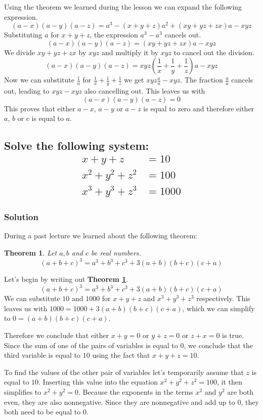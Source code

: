 \documentclass{article}
\newcommand{\solution}{\subsubsection*{\textcolor{MainColor}{Solution}}}
\newcounter{theoremcounter}
\theoremstyle{maintheorem}
\newtheorem{theorem}[theoremcounter]{\textcolor{SubColor}{Theorem}}
\newcommand{\thmref}[1]{\textcolor{SubSubColor}{\textbf{Theorem \ref{#1}}}}
\begin{document}
Using the theorem we learned during the lesson we can expand the following expression.
\[(a-x)(a-y)(a-z) = a^3 - (x + y + z)a^2 + (xy + yz + zx)a - xyz\]
Substituting $a$ for $ x + y + z $, the expression $a^3 - a^3$ cancels out.
\[(a-x)(a-y)(a-z) = (xy + yz + zx)a - xyz\]
We divide $xy + yz + zx$ by $xyz$ and multiply it by $xyz$ to cancel out the division.
\[(a-x)(a-y)(a-z) = xyz\left(\frac{1}{x} + \frac{1}{y} + \frac{1}{z}\right)a - xyz\]
Now we can substitute $ \frac{1}{a} $ for $ \frac{1}{x} + \frac{1}{y} + \frac{1}{z} $ we get $ xyz\frac{a}{a} - xyz $. The fraction $ \frac{a}{a} $ cancels out, leading to $xyz - xyz$ also cancelling out.
This leaves us with
\[(a-x)(a-y)(a-z) = 0\]
This proves that either $a - x$, $a - y$ or $a - z$ is equal to zero and therefore either $a$, $b$ or $c$ is equal to $a$.

\subsection{
	\normalfont
	Solve the following system:
	\begin{align*}
		x + y + z       & = 10   \\
		x^2 + y^2 + z^2 & = 100  \\
		x^3 + y^3 + z^3 & = 1000
	\end{align*}
}

\solution

During a past lecture we learned about the following theorem:
\begin{theorem}\label{thm2}
	Let $a, b$ and $c$ be real numbers.
	\[ (a + b + c)^3 = a^3 + b^3 + c^3 + 3(a + b)(b + c)(c + a) \]
\end{theorem}

Let's begin by writing out \thmref{thm2}.
\[ (a + b + c)^3 = a^3 + b^3 + c^3 + 3(a + b)(b + c)(c + a) \]
We can substitute $10$ and $1000$ for $x + y + z$ and $x^3 + y^3 + z^3$ respectively. This leaves us with $1000 = 1000 + 3(a + b)(b + c)(c + a)$,
which we can simplify to $0 = (a + b)(b + c)(c + a)$.

Therefore we conclude that either $x + y = 0$ or $y + z = 0$ or $z + x = 0$ is true.
Since the sum of one of the pairs of variables is equal to $0$, we conclude that the third variable is equal to $10$ using the fact that $x + y + z = 10$.

To find the values of the other pair of variables let's temporarily assume that $z$ is equal to $10$. Inserting this value into the equation $x^2 + y^2 + z^2 = 100$, it then simplifies to $x^2 + y^2 = 0$.
Because the exponents in the terms $x^2$ and $y^2$ are both even, they are also nonnegative. Since they are nonnegative and add up to $0$, they both need to be equal to $0$.
\end{document}
